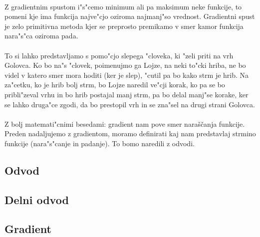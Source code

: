 \paragraph{}
Z gradientnim spustom i"s"cemo minimum ali pa maksimum neke funkcije, to pomeni kje ima funkcija najve"cjo oziroma najmanj"so vrednost. Gradientni spust je zelo primitivna metoda kjer se preprosto premikamo v smer kamor funkcija nara"s"ca oziroma pada.

\paragraph{}
To si lahko predstavljamo s pomo"cjo slepega "cloveka, ki "zeli priti na vrh Golovca. Ko bo na"s "clovek, poimenujmo ga Lojze, na neki to"cki hriba, ne bo videl v katero smer mora hoditi (ker je slep), "cutil pa bo kako strm je hrib. Na za"cetku, ko je hrib bolj strm, bo Lojze naredil ve"cji korak, ko pa se bo pribli"zeval vrhu in bo hrib postajal manj strm, pa bo delal manj"se korake, ker se lahko druga"ce zgodi, da bo prestopil vrh in se zna"sel na drugi strani Golovca.

\paragraph{}
Z bolj matemati"cnimi besedami: gradient nam pove smer naraščanja funkcije. Preden nadaljujemo z gradientom, moramo definirati kaj nam predstavlaj strmino funkcije (nara"s"canje in padanje). To bomo naredili z odvodi.

\subsection*{Odvod}


\subsection*{Delni odvod}


\subsection*{Gradient}
